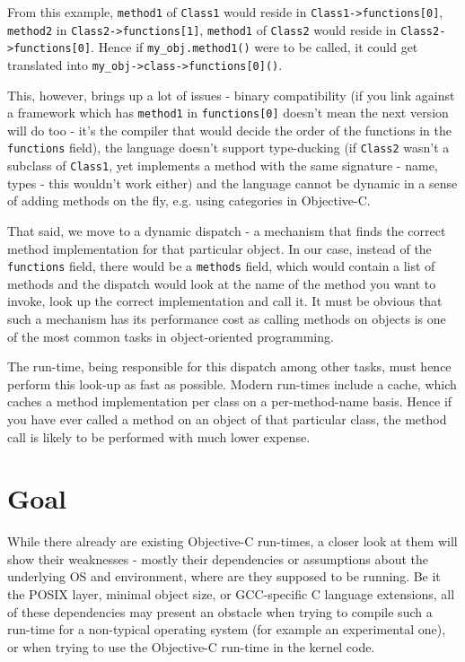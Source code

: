 From this example, \verb=method1= of \verb=Class1= would reside in \verb=Class1->functions[0]=, \verb=method2= in \verb=Class2->functions[1]=, \verb=method1= of \verb=Class2= would reside in \newline{}\verb=Class2->functions[0]=. Hence if \verb=my_obj.method1()= were to be called, it could get translated into \verb=my_obj->class->functions[0]()=.

This, however, brings up a lot of issues - binary compatibility (if you link against a framework which has \verb=method1= in \verb=functions[0]= doesn't mean the next version will do too - it's the compiler that would decide the order of the functions in the \verb=functions= field), the language doesn't support type-ducking (if \verb=Class2= wasn't a subclass of \verb=Class1=, yet implements a method with the same signature - name, types - this wouldn't work either) and the language cannot be dynamic in a sense of adding methods on the fly, e.g. using categories in Objective-C.

That said, we move to a dynamic dispatch - a mechanism that finds the correct method implementation for that particular object. In our case, instead of the \verb=functions= field, there would be a \verb=methods= field, which would contain a list of methods and the dispatch would look at the name of the method you want to invoke, look up the correct implementation and call it. It must be obvious that such a mechanism has its performance cost as calling methods on objects is one of the most common tasks in object-oriented programming.

The run-time, being responsible for this dispatch among other tasks, must hence perform this look-up as fast as possible. Modern run-times include a cache, which caches a method implementation per class on a per-method-name basis. Hence if you have ever called a method on an object of that particular class, the method call is likely to be performed with much lower expense.

\section{Goal}

While there already are existing Objective-C run-times, a closer look at them will show their weaknesses - mostly their dependencies or assumptions about the underlying OS and environment, where are they supposed to be running. Be it the POSIX layer, minimal object size, or GCC-specific C language extensions, all of these dependencies may present an obstacle when trying to compile such a run-time for a non-typical operating system (for example an experimental one), or when trying to use the Objective-C run-time in the kernel code.

